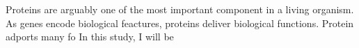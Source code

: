 Proteins are arguably one of the most important component in a living organism. As genes encode biological feactures, proteins deliver biological functions. Protein adports many fo In this study, I will be 
